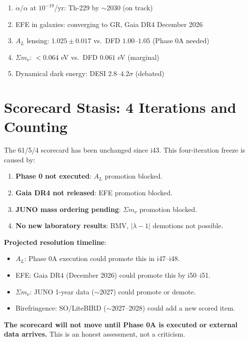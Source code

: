 \documentclass[11pt,a4paper]{article}
\begin{document}
\begin{enumerate}
\item $\dot{\alpha}/\alpha$ at $10^{-19}$/yr: Th-229 by $\sim$2030 (on track)
\item EFE in galaxies: converging to GR, Gaia DR4 December 2026
\item $A_L$ lensing: $1.025 \pm 0.017$ vs.\ DFD $1.00$--$1.05$ (Phase 0A needed)
\item $\Sigma m_\nu$: $< 0.064$ eV vs.\ DFD $0.061$ eV (marginal)
\item Dynamical dark energy: DESI $2.8$--$4.2\sigma$ (debated)
\end{enumerate}

\section{Scorecard Stasis: 4 Iterations and Counting}

\begin{tcolorbox}[colback=yellow!5!white, colframe=yellow!60!black,
  title={HONEST ASSESSMENT: Scorecard Frozen for 4 Iterations}]

The 61/5/4 scorecard has been unchanged since i43. This four-iteration freeze is caused by:

\begin{enumerate}
\item \textbf{Phase 0 not executed}: $A_L$ promotion blocked.
\item \textbf{Gaia DR4 not released}: EFE promotion blocked.
\item \textbf{JUNO mass ordering pending}: $\Sigma m_\nu$ promotion blocked.
\item \textbf{No new laboratory results}: BMV, $|\lambda-1|$ demotions not possible.
\end{enumerate}

\textbf{Projected resolution timeline}:
\begin{itemize}
\item $A_L$: Phase 0A execution could promote this in i47--i48.
\item EFE: Gaia DR4 (December 2026) could promote this by i50--i51.
\item $\Sigma m_\nu$: JUNO 1-year data ($\sim$2027) could promote or demote.
\item Birefringence: SO/LiteBIRD ($\sim$2027--2028) could add a new scored item.
\end{itemize}

\textbf{The scorecard will not move until Phase 0A is executed or external data arrives.} This is an honest assessment, not a criticism.
\end{tcolorbox}
\end{document}
